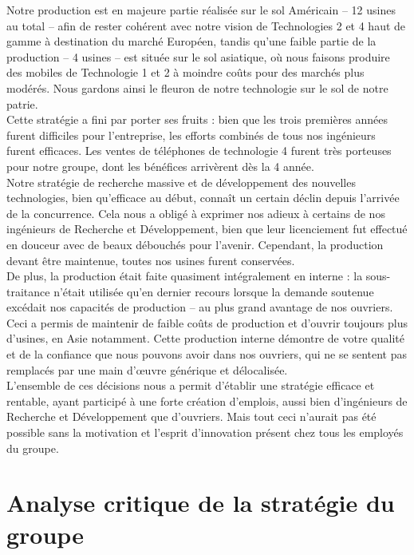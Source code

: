 \documentclass[a4paper,11pt]{article}
\theoremstyle{remark}
\begin{document}
		Notre production est en majeure partie réalisée sur le sol Américain -- 12 usines au total -- afin de rester cohérent avec notre vision de Technologies 2 et 4 haut de gamme à destination du marché Européen, tandis qu'une faible partie de la production -- 4 usines -- est située sur le sol asiatique, où nous faisons produire des mobiles de Technologie 1 et 2 à moindre coûts pour des marchés plus modérés.
		Nous gardons ainsi le fleuron de notre technologie sur le sol de notre patrie.
		\mbox{}\\
 
		Cette stratégie a fini par porter ses fruits : bien que les trois premières années furent difficiles pour l'entreprise, les efforts combinés de tous nos ingénieurs furent efficaces. Les ventes de téléphones de technologie 4 furent très porteuses pour notre groupe, dont les bénéfices arrivèrent dès la 4 année.
		\mbox{}\\
		 
		Notre stratégie de recherche massive et de développement des nouvelles technologies, bien qu'efficace au début, connaît un certain déclin depuis l'arrivée de la concurrence.
		Cela nous a obligé à exprimer nos adieux	à certains de nos ingénieurs de Recherche et Développement, bien que leur licenciement fut effectué en douceur avec de beaux débouchés pour l'avenir.
		Cependant, la production devant être maintenue, toutes nos usines	furent conservées.
		\mbox{}\\
		 
		De plus, la production était faite quasiment intégralement en interne : la sous-traitance n'était utilisée qu'en dernier recours lorsque la demande soutenue excédait nos capacités de production -- au plus grand	avantage de nos ouvriers.
		Ceci a permis de maintenir de faible coûts de production et d'ouvrir toujours plus d'usines, en Asie notamment.
		Cette production interne démontre de votre qualité et de la confiance que	nous pouvons avoir dans nos ouvriers, qui ne se sentent pas remplacés par une main d'œuvre générique et délocalisée.
		\mbox{}\\
		 
		L'ensemble de ces décisions nous a permit d'établir une stratégie efficace et rentable, ayant participé à une forte création d'emplois, aussi bien d'ingénieurs de Recherche et Développement que d'ouvriers.
		Mais tout ceci n'aurait pas été possible sans la motivation et l'esprit d'innovation présent chez tous les employés du groupe.

\section{Analyse critique de la stratégie du groupe}
\end{document}
